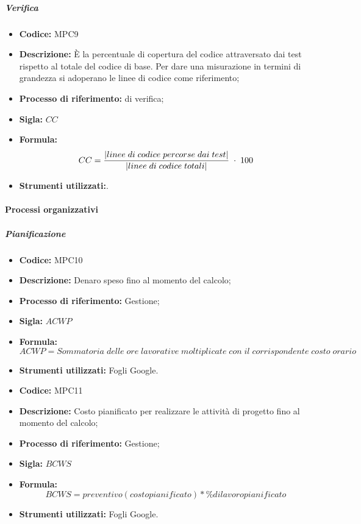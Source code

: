 \subparagraph{Verifica}
\begin{itemize}
	\item \textbf{Codice:} MPC9
	\item \textbf{Descrizione:} È la percentuale di copertura del codice attraversato dai test rispetto al totale del codice di base. Per dare una misurazione in termini di grandezza si adoperano le linee di codice come riferimento;
	\item \textbf{Processo di riferimento:}  di verifica;
	\item \textbf{Sigla:} $CC$
	\item \textbf{Formula:} $$CC = {|linee \; di \; codice \; percorse \; dai  \; test| \over |linee \; di \; codice \; totali|} \; \cdot \; 100$$
	\item \textbf{Strumenti utilizzati:}.
\end{itemize}
    \paragraph{Processi organizzativi}

\subparagraph{Pianificazione}

    \begin{itemize}
        \item \textbf{Codice:} MPC10
        \item \textbf{Descrizione:} Denaro speso fino al momento del calcolo;
        \item \textbf{Processo di riferimento:} Gestione;
        \item \textbf{Sigla:} $ACWP$
        \item \textbf{Formula:} $$ACWP = {Sommatoria\; delle\; ore\; lavorative\; moltiplicate\; con\; il\; corrispondente\; costo\; orario}$$
        \item \textbf{Strumenti utilizzati:} Fogli Google.
    \end{itemize}

\begin{itemize}
	\item \textbf{Codice:} MPC11
	\item \textbf{Descrizione:} Costo pianificato per realizzare le attività di progetto fino al momento del calcolo;
	\item \textbf{Processo di riferimento:} Gestione;
	\item \textbf{Sigla:} $BCWS$
	\item \textbf{Formula:} $$BCWS = {preventivo(costo pianificato) * \% di lavoro pianificato}$$
	\item \textbf{Strumenti utilizzati:} Fogli Google.
\end{itemize}

